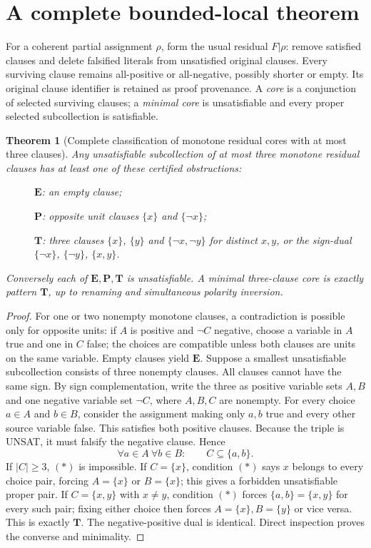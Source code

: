 \documentclass[11pt]{article}
\newtheorem{theorem}{Theorem}
\begin{document}
\section{A complete bounded-local theorem}
For a coherent partial assignment $\rho$, form the usual residual $F|\rho$: remove satisfied clauses and delete falsified literals from unsatisfied original clauses. Every surviving clause remains all-positive or all-negative, possibly shorter or empty. Its original clause identifier is retained as proof provenance. A \emph{core} is a conjunction of selected surviving clauses; a \emph{minimal core} is unsatisfiable and every proper selected subcollection is satisfiable.
\begin{theorem}[Complete classification of monotone residual cores with at most three clauses]
Any unsatisfiable subcollection of at most three monotone residual clauses has at least one of these certified obstructions:
\begin{description}
\item[] $\mathbf{E}$: an empty clause;
\item[] $\mathbf{P}$: opposite unit clauses $\{x\}$ and $\{\neg x\}$;
\item[] $\mathbf{T}$: three clauses $\{x\}$, $\{y\}$ and $\{\neg x,\neg y\}$ for distinct $x,y$, or the sign-dual $\{\neg x\}$, $\{\neg y\}$, $\{x,y\}$.
\end{description}
Conversely each of $\mathbf E,\mathbf P,\mathbf T$ is unsatisfiable. A minimal three-clause core is exactly pattern $\mathbf T$, up to renaming and simultaneous polarity inversion.
\end{theorem}
\begin{proof}
For one or two nonempty monotone clauses, a contradiction is possible only for opposite units: if $A$ is positive and $\neg C$ negative, choose a variable in $A$ true and one in $C$ false; the choices are compatible unless both clauses are units on the same variable. Empty clauses yield $\mathbf E$.
Suppose a smallest unsatisfiable subcollection consists of three nonempty clauses. All clauses cannot have the same sign. By sign complementation, write the three as positive variable sets $A,B$ and one negative variable set $\neg C$, where $A,B,C$ are nonempty. For every choice $a\in A$ and $b\in B$, consider the assignment making only $a,b$ true and every other source variable false. This satisfies both positive clauses. Because the triple is UNSAT, it must falsify the negative clause. Hence
\[
 \forall a\in A\ \forall b\in B:\qquad C\subseteq\{a,b\}.\tag{$*$}
\]
If $|C|\ge 3$, $(*)$ is impossible. If $C=\{x\}$, condition $(*)$ says $x$ belongs to every choice pair, forcing $A=\{x\}$ or $B=\{x\}$; this gives a forbidden unsatisfiable proper pair. If $C=\{x,y\}$ with $x\ne y$, condition $(*)$ forces $\{a,b\}=\{x,y\}$ for every such pair; fixing either choice then forces $A=\{x\},B=\{y\}$ or vice versa. This is exactly $\mathbf T$. The negative-positive dual is identical. Direct inspection proves the converse and minimality.
\end{proof}
\end{document}
